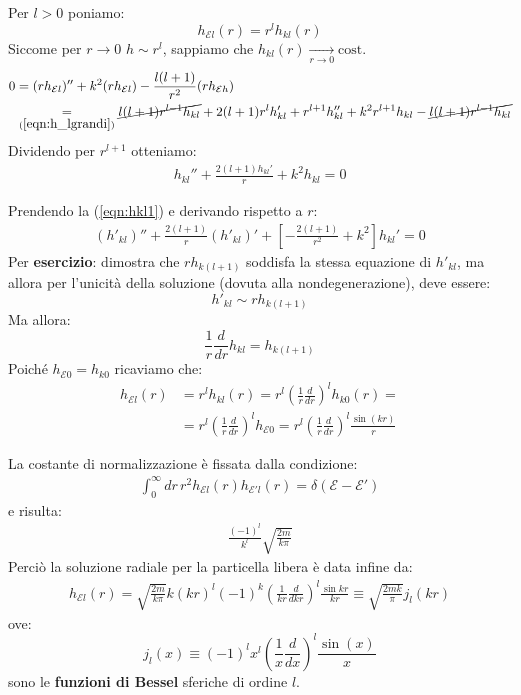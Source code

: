 \documentclass[../../FisicaTeorica.tex]{subfiles}
\begin{document}
Per $l>0$ poniamo:
\begin{equation}
h_{\mathcal{E}l}(r) = r^l h_{kl}(r)
\label{eqn:h_lgrandi}
\end{equation}
Siccome per $r\to 0$ $h\sim r^l$, sappiamo che $h_{kl}(r) \xrightarrow[r \to 0]{} \text{cost}$.\\

\begin{align*}
0 &= (rh_{\mathcal{E}l})''+k^2(r h_{\mathcal{E}l})-\frac{l(l+1)}{r^2}(rh_{\mathcal{E}h})\\ &\underset{(\ref{eqn:h_lgrandi})}{=} \cancel{l(l+1)r^{l-1} h_{kl} }+ 2(l+1) r^l h_{kl}' + r^{l+1}h_{kl}'' + k^2 r^{l+1}h_{kl} -\cancel{ l(l+1)r^{l-1}h_{kl}}
\end{align*}
Dividendo per $r^{l+1}$ otteniamo:
\begin{align}
h_{kl}'' + \frac{2(l+1) h_{kl}'}{r} + k^2 h_{kl} = 0
\label{eqn:hkl1}
\end{align}

Prendendo la (\ref{eqn:hkl1}) e derivando rispetto a $r$:
\begin{align*}
(h'_{kl})'' + \frac{2(l+1)}{r}(h'_{kl})' + \left[
-\frac{2(l+1)}{r^2}+k^2
\right] h_{kl}' = 0
\end{align*}
Per \textbf{esercizio}: dimostra che $rh_{k(l+1)}$ soddisfa la stessa equazione di $h'_{kl}$, ma allora per l'unicità della soluzione (dovuta alla nondegenerazione), deve essere:
\[
h'_{kl} \sim r h_{k(l+1)}
\]
Ma allora:
\[
\frac{1}{r} \frac{d}{dr} h_{kl} =h_{k(l+1)}
\]
Poiché $h_{\mathcal{E}0} = h_{k0}$ ricaviamo che:
\begin{align*}
h_{\mathcal{E}l}(r) &= r^l h_{kl}(r) = r^l \left( 
\frac{1}{r} \frac{d}{dr}
\right)^l h_{k0}(r) =\\
&= r^l \left( \frac{1}{r} \frac{d}{dr}\right)^l h_{\mathcal{E}0} = r^l \left(\frac{1}{r}\frac{d}{dr}\right)^l \frac{\sin(kr)}{r}
\end{align*}

La costante di normalizzazione è fissata dalla condizione:
\begin{align*}
\int_0^\infty dr\, r^2 h_{\mathcal{E}l}(r) h_{\mathcal{E}'l}(r) = \delta(\mathcal{E}-\mathcal{E}')
\end{align*}
e risulta:
\begin{align*}
\frac{(-1)^l}{k^l}\sqrt{\frac{2m}{k\pi}}
\end{align*}
Perciò la soluzione radiale per la particella libera è data infine da:
\begin{align*}
h_{\mathcal{E}l}(r) = \sqrt{\frac{2m}{k\pi}} k (kr)^l (-1)^k \left(\frac{1}{kr}\frac{d}{dkr}\right)^l \frac{\sin kr}{kr} \equiv \sqrt{\frac{2mk}{\pi}} j_l(kr)
\end{align*}
ove:
\[
j_l(x) \equiv (-1)^l x^l \left(\frac{1}{x} \frac{d}{dx}\right)^l \frac{\sin(x)}{x}
\]
sono le \textbf{funzioni di Bessel} sferiche di ordine $l$.\\
\end{document}
